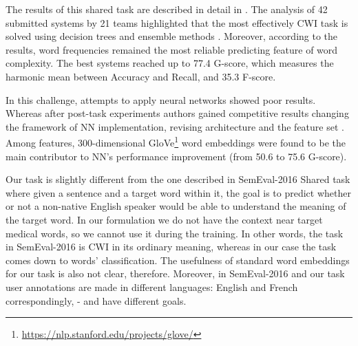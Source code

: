 The results of this shared task are described in detail in \cite{Paetzold-SemEval2016overview}. The analysis of 42 submitted systems by 21 teams highlighted that the most effectively CWI task is solved using decision trees \citep{Malmasi-SemEval2016} and ensemble methods \citep{Paetzold-SemEval2016solution, Ronzano-SemEval2016}. Moreover, according to the results, word frequencies remained the most reliable predicting feature of word complexity. The best systems reached up to 77.4 G-score, which measures the harmonic mean between Accuracy and Recall, and 35.3 F-score. 

In this challenge, attempts to apply neural networks showed poor results. Whereas after post-task experiments authors gained competitive results changing the framework of NN implementation, revising architecture and the feature set \citep{Bingel-SemEval2016}. Among features, 300-dimensional GloVe\footnote{\url{https://nlp.stanford.edu/projects/glove/}} word embeddings were found to be the main contributor to NN's performance improvement (from 50.6 to 75.6 G-score). 

Our task is slightly different from the one described in SemEval-2016 Shared task \citep{Paetzold-SemEval2016overview} where given a sentence and a target word within it, the goal is to predict whether or not a non-native English speaker would be able to understand the meaning of the target word. In our formulation we do not have the context near target medical words, so we cannot use it during the training. In other words, the task in SemEval-2016 is CWI in its ordinary meaning, whereas in our case the task comes down to words' classification. The usefulness of standard word embeddings for our task is also not clear, therefore. Moreover, in SemEval-2016 and our task user annotations are made in different languages: English and French correspondingly, -  and have different goals.

